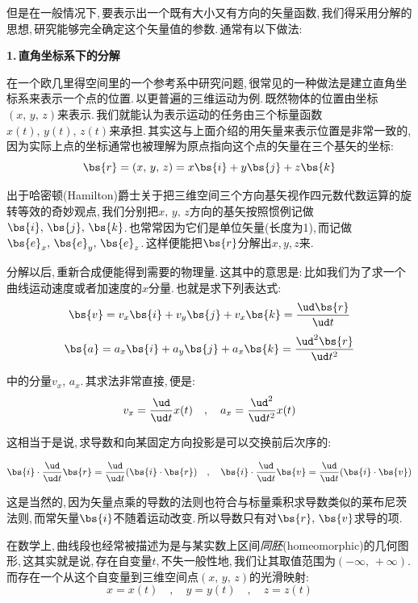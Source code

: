 但是在一般情况下,\,要表示出一个既有大小又有方向的矢量函数,\,我们得采用分解的思想,\,研究能够完全确定这个矢量值的参数.\,通常有以下做法:

\vspace{0.2cm}
{\bf 1.\,直角坐标系下的分解}

在一个欧几里得空间里的一个参考系中研究问题,\,很常见的一种做法是建立直角坐标系来表示一个点的位置.\,以更普遍的三维运动为例.\,既然物体的位置由坐标$(x,\,y,\,z)$来表示.\,我们就能认为表示运动的任务由三个标量函数$x(t),\,y(t),\,z(t)$来承担.\,其实这与上面介绍的用矢量来表示位置是非常一致的,\,因为实际上点的坐标通常也被理解为原点指向这个点的矢量在三个基矢的坐标:
\[\bs{r}=(x,\,y,\,z)=x\bs{i}+y\bs{j}+z\bs{k}\]

出于哈密顿(Hamilton)爵士关于把三维空间三个方向基矢视作四元数代数运算的旋转等效的奇妙观点,\,我们分别把$x,\,y,\,z$方向的基矢按照惯例记做$\bs{i},\,\bs{j},\,\bs{k}$.\,也常常因为它们是单位矢量(长度为1),\,而记做$\bs{e}_x,\,\bs{e}_y,\,\bs{e}_z$.\,这样便能把$\bs{r}$分解出$x$,\,$y$,\,$z$来.

分解以后,\,重新合成便能得到需要的物理量.\,这其中的意思是:\,比如我们为了求一个曲线运动速度或者加速度的$x$分量.\,也就是求下列表达式:
\[\bs{v}=v_x\bs{i}+v_y\bs{j}+v_x\bs{k}=\frac{\ud \bs{r}}{\ud t}\]
\[\bs{a}=a_x\bs{i}+a_y\bs{j}+a_x\bs{k}=\frac{\ud^2 \bs{r}}{\ud t^2}\]

中的分量$v_x,\,a_x$.\,其求法非常直接,\,便是:
\[v_x=\frac{\ud }{\ud t}x(t)\quad,\quad a_x=\frac{\ud^2 }{\ud t^2}x(t)\]

这相当于是说,\,求导数和向某固定方向投影是可以交换前后次序的:

\[\bs{i}\cdot \frac{\ud }{\ud t}\bs{r}=\frac{\ud }{\ud t}(\bs{i}\cdot \bs{r})\quad,\quad \bs{i}\cdot \frac{\ud }{\ud t}\bs{v}=\frac{\ud }{\ud t}(\bs{i}\cdot \bs{v})\]

这是当然的,\,因为矢量点乘的导数的法则也符合与标量乘积求导数类似的莱布尼茨法则,\,而常矢量$\bs{i}$不随着运动改变.\,所以导数只有对$\bs{r},\,\bs{v}$求导的项.

在数学上,\,曲线段也经常被描述为是与某实数上区间\emph{同胚}(homeomorphic)的几何图形,\,这其实就是说,\,存在自变量$t$,\,不失一般性地,\,我们让其取值范围为$(-\infty,\,+\infty)$.\,而存在一个从这个自变量到三维空间点$(x,\,y,\,z)$的光滑映射:
\[x=x(t)\quad ,\quad y=y(t)\quad ,\quad z=z(t)\]

